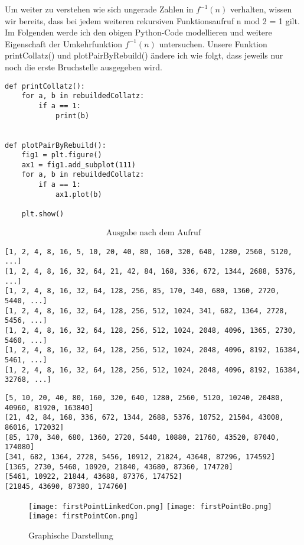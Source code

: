 \documentclass{article}
\begin{document}
\noindent Um weiter zu verstehen wie sich ungerade Zahlen in $f^{-1}(n)$ verhalten, wissen wir bereits, dass bei jedem weiteren rekursiven Funktionsaufruf n mod 2 = 1 gilt. Im Folgenden werde ich den obigen Python-Code modellieren und weitere Eigenschaft der Umkehrfunktion $f^{-1}(n)$ untersuchen. Unsere Funktion printCollatz() und plotPairByRebuild() ändere ich wie folgt, dass jeweils nur noch die erste Bruchstelle ausgegeben wird.
\begin{verbatim}
def printCollatz():
    for a, b in rebuildedCollatz:
        if a == 1:
            print(b)


def plotPairByRebuild():
    fig1 = plt.figure()
    ax1 = fig1.add_subplot(111)
    for a, b in rebuildedCollatz:
        if a == 1:
            ax1.plot(b)

    plt.show()
\end{verbatim}
\begin{gather*}
\text{Ausgabe nach dem Aufruf}
\end{gather*}
\begin{verbatim}
[1, 2, 4, 8, 16, 5, 10, 20, 40, 80, 160, 320, 640, 1280, 2560, 5120, ...]
[1, 2, 4, 8, 16, 32, 64, 21, 42, 84, 168, 336, 672, 1344, 2688, 5376, ...]
[1, 2, 4, 8, 16, 32, 64, 128, 256, 85, 170, 340, 680, 1360, 2720, 5440, ...]
[1, 2, 4, 8, 16, 32, 64, 128, 256, 512, 1024, 341, 682, 1364, 2728, 5456, ...]
[1, 2, 4, 8, 16, 32, 64, 128, 256, 512, 1024, 2048, 4096, 1365, 2730, 5460, ...]
[1, 2, 4, 8, 16, 32, 64, 128, 256, 512, 1024, 2048, 4096, 8192, 16384, 5461, ...]
[1, 2, 4, 8, 16, 32, 64, 128, 256, 512, 1024, 2048, 4096, 8192, 16384, 32768, ...]
\end{verbatim}
\begin{verbatim}
[5, 10, 20, 40, 80, 160, 320, 640, 1280, 2560, 5120, 10240, 20480, 40960, 81920, 163840]
[21, 42, 84, 168, 336, 672, 1344, 2688, 5376, 10752, 21504, 43008, 86016, 172032]
[85, 170, 340, 680, 1360, 2720, 5440, 10880, 21760, 43520, 87040, 174080]
[341, 682, 1364, 2728, 5456, 10912, 21824, 43648, 87296, 174592]
[1365, 2730, 5460, 10920, 21840, 43680, 87360, 174720]
[5461, 10922, 21844, 43688, 87376, 174752]
[21845, 43690, 87380, 174760]
\end{verbatim}
\begin{wrapfigure}
\texttt{[image: firstPointLinkedCon.png]}\hfill
\texttt{[image: firstPointBo.png]}\hfill
\texttt{[image: firstPointCon.png]}
\caption{Graphische Darstellung}
\end{wrapfigure}
\end{document}
